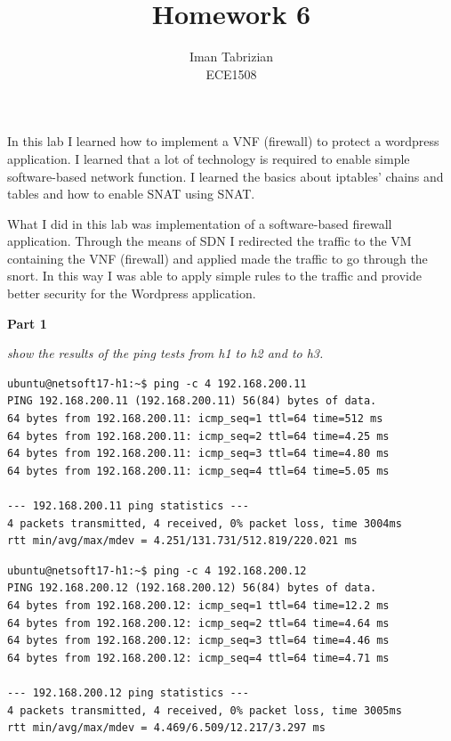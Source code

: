 \documentclass[12pt]{article}
\begin{document}
 
 
\title{Homework 6}
\author{Iman Tabrizian\\ %
ECE1508}

\maketitle

In this lab I learned how to implement a VNF (firewall) to protect a wordpress 
application. I learned that a lot of technology is required to enable simple
software-based network function. I learned the basics about iptables' chains and
tables and how to enable SNAT using SNAT.

What I did in this lab was implementation of a software-based firewall application.
Through the means of SDN I redirected the traffic to the VM containing the VNF (firewall)
and applied made the traffic to go through the snort. In this way I was able
to apply simple rules to the traffic and provide better security for the Wordpress
application.

\vspace{5mm} 
\textbf{Part 1}

\vspace{2mm} 
\textit{show the results of the ping tests from h1 to h2 and to h3.}
\vspace{2mm} 

\begin{verbatim}
ubuntu@netsoft17-h1:~$ ping -c 4 192.168.200.11
PING 192.168.200.11 (192.168.200.11) 56(84) bytes of data.
64 bytes from 192.168.200.11: icmp_seq=1 ttl=64 time=512 ms
64 bytes from 192.168.200.11: icmp_seq=2 ttl=64 time=4.25 ms
64 bytes from 192.168.200.11: icmp_seq=3 ttl=64 time=4.80 ms
64 bytes from 192.168.200.11: icmp_seq=4 ttl=64 time=5.05 ms

--- 192.168.200.11 ping statistics ---
4 packets transmitted, 4 received, 0% packet loss, time 3004ms
rtt min/avg/max/mdev = 4.251/131.731/512.819/220.021 ms
\end{verbatim}

\begin{verbatim}
ubuntu@netsoft17-h1:~$ ping -c 4 192.168.200.12
PING 192.168.200.12 (192.168.200.12) 56(84) bytes of data.
64 bytes from 192.168.200.12: icmp_seq=1 ttl=64 time=12.2 ms
64 bytes from 192.168.200.12: icmp_seq=2 ttl=64 time=4.64 ms
64 bytes from 192.168.200.12: icmp_seq=3 ttl=64 time=4.46 ms
64 bytes from 192.168.200.12: icmp_seq=4 ttl=64 time=4.71 ms

--- 192.168.200.12 ping statistics ---
4 packets transmitted, 4 received, 0% packet loss, time 3005ms
rtt min/avg/max/mdev = 4.469/6.509/12.217/3.297 ms
\end{verbatim}
\end{document}

